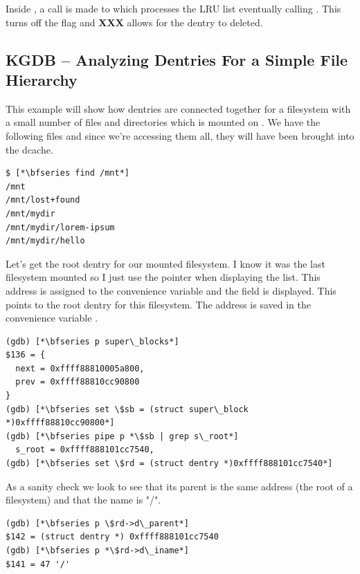 \noindent
Inside , a call is made to  which processes the LRU list eventually calling . This turns off the  flag and \textbf{XXX} allows for the dentry to deleted.


\subsection{KGDB -- Analyzing Dentries For a Simple File Hierarchy}

This example will show how dentries are connected together for a filesystem with a small number of files and directories which is mounted on . We have the following files and since we're accessing them all, they will have been brought into the dcache.

\begin{lstlisting}
$ [*\bfseries find /mnt*]
/mnt
/mnt/lost+found
/mnt/mydir
/mnt/mydir/lorem-ipsum
/mnt/mydir/hello
\end{lstlisting}

\noindent
Let's get the root dentry for our mounted filesystem. I know it was the last filesystem mounted so I just use the  pointer when displaying the  list. This address is assigned to the convenience variable  and the  field is displayed. This points to the root dentry for this filesystem. The address is saved in the convenience variable .

\begin{lstlisting}
(gdb) [*\bfseries p super\_blocks*]
$136 = {
  next = 0xffff88810005a800,
  prev = 0xffff88810cc90800
}
(gdb) [*\bfseries set \$sb = (struct super\_block *)0xffff88810cc90800*]
(gdb) [*\bfseries pipe p *\$sb | grep s\_root*]
  s_root = 0xffff888101cc7540,
(gdb) [*\bfseries set \$rd = (struct dentry *)0xffff888101cc7540*]
\end{lstlisting}

\noindent
As a sanity check we look to see that its parent is the same address (the root of a filesystem) and that the name is "/".

\begin{lstlisting}
(gdb) [*\bfseries p \$rd->d\_parent*]
$142 = (struct dentry *) 0xffff888101cc7540
(gdb) [*\bfseries p *\$rd->d\_iname*]
$141 = 47 '/'
\end{lstlisting}

